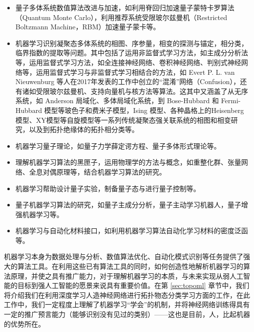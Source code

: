 \begin{itemize}

\item 量子多体系统数值算法改进与加速，如利用脊回归加速量子蒙特卡罗算法（Quantum Monte Carlo）\cite{acmc1,acmc2,acmc3,acmc4}，利用推荐系统受限玻尔兹曼机（Restricted Boltzmann Machine，RBM）加速量子蒙卡\cite{acmcwl1,acmcwl2}等。

\item 机器学习识别凝聚态多体系统的相图、序参量，相变的探测与锚定，相分类，临界指数的提取等问题\cite{ml-anderson-2014,confusion,mlphase2017-nphys,wangleipca2016,wcpca,mlphase2017-prx,jp1,jp2,jp3,jp4,zhangyiml2017,zpf2017,topoml,wanxin-2017,kernel2017,ml-mbl-2017,pca2017a,pca2017b,rbm-2017,unsup-2017,unsup-hubb-2018,discriminative2018,ml-disorder-2018}。其中包括了运用非监督式学习方法\cite{unsup-2017,unsup-hubb-2018}，如主成分分析法\cite{wangleipca2016,wcpca,pca2017a,pca2017b}等，运用监督式学习方法，如全连接神经网络\cite{zhangyiml2017,mlphase2017-prx,ml-mbl-2017}、卷积神经网络\cite{zpf2017,jp1,jp2,jp3,jp4,mlphase2017-nphys,wanxin-2017}、判别式神经网络\cite{discriminative2018}等，运用监督式学习与非监督式学习相结合的方法，如 Evert P. L. van Nieuwenburg 等人在2017年发表的工作\cite{confusion}中创立的“混淆”网络（Confusion），还有诸如受限玻尔兹曼机\cite{rbm-2017}、支持向量机与核方法\cite{kernel2017}等算法。这其中又涵盖了从无序系统\cite{ml-disorder-2018}，如 Anderson 局域化\cite{ml-anderson-2014,jp1,jp2,jp4}、多体局域化\cite{ml-mbl-2017}系统，到 Bose-Hubbard 和 Fermi-Hubbard 模型等玻色子和费米子模型\cite{confusion,rbm-2017,mlphase2017-prx,pca2017b,unsup-hubb-2018}，Ising 模型\cite{jp3,kernel2017,mlphase2017-nphys,wangleipca2016,wcpca,wanxin-2017}、各种晶格上的Heisenberg 模型、XY模型\cite{pca2017a,unsup-2017,wcpca}等自旋模型等一系列传统凝聚态强关联系统的相图和相变研究，以及到拓扑绝缘体的拓扑相分类\cite{zhangyiml2017,zpf2017,jp1,jp2}等。

\item 机器学习量子理论，如量子力学薛定谔方程\cite{dlshrodinger2017,wyd2018}、量子多体形式理论\cite{ml-manybody}等。

\item 理解机器学习算法的黑匣子\cite{mlanalysis2017lin}，运用物理学的方法与概念，如重整化群\cite{dlrg2013,maprgdl2014,rgml2018}、张量网络、全息对偶原理\cite{yyz2018}等，结合机器学习算法的研究。

\item 机器学习帮助设计量子实验\cite{activelearn-exprdesign-2018}，制备量子态与进行量子控制\cite{rein-2018-prx}等。

\item 量子机器学习算法的研究\cite{qml2017,qai2017}，如量子主成分分析\cite{qpca2014}，量子主动学习机器人\cite{active-agent-2014}，量子增强机器学习\cite{qeml}等。

\item 机器学习与自动化材料接口，如利用机器学习算法自动化学习材料的密度泛函\cite{wcyyz}等。

\end{itemize}


机器学习本身为数据处理与分析、数值算法优化、自动化模式识别等任务提供了强大的算法工具。在利用这些已有算法工具的同时，如何创造性地解析机器学习的算法原理，并使之具有推广能力，对于理解机器学习的本质，与未来实现从弱人工智能的目标到强人工智能的愿景来说具有重要价值。在第 \ref{sec:topoml} 章节中，我们将介绍我们在利用深度学习人造神经网络进行拓扑物态分类学习方面的工作\cite{topoml}，在此工作中，我们一定程度上理解了机器学习“学会”的机制，并将神经网络训练得具有一定的推广预言能力（能够识别没有见过的类别）——这也是目前，人，比起机器的优势所在。


